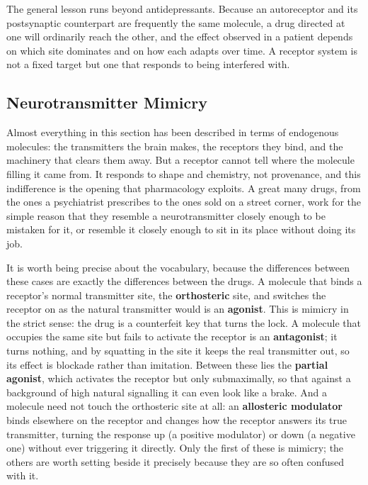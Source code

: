 \documentclass[11pt]{article}
\begin{document}
The general lesson runs beyond antidepressants. Because an autoreceptor and its postsynaptic counterpart are frequently the same molecule, a drug directed at one will ordinarily reach the other, and the effect observed in a patient depends on which site dominates and on how each adapts over time. A receptor system is not a fixed target but one that responds to being interfered with.

\subsection{Neurotransmitter Mimicry}

Almost everything in this section has been described in terms of endogenous molecules: the transmitters the brain makes, the receptors they bind, and the machinery that clears them away. But a receptor cannot tell where the molecule filling it came from. It responds to shape and chemistry, not provenance, and this indifference is the opening that pharmacology exploits. A great many drugs, from the ones a psychiatrist prescribes to the ones sold on a street corner, work for the simple reason that they resemble a neurotransmitter closely enough to be mistaken for it, or resemble it closely enough to sit in its place without doing its job.

It is worth being precise about the vocabulary, because the differences between these cases are exactly the differences between the drugs. A molecule that binds a receptor's normal transmitter site, the \textbf{orthosteric} site, and switches the receptor on as the natural transmitter would is an \textbf{agonist}. This is mimicry in the strict sense: the drug is a counterfeit key that turns the lock. A molecule that occupies the same site but fails to activate the receptor is an \textbf{antagonist}; it turns nothing, and by squatting in the site it keeps the real transmitter out, so its effect is blockade rather than imitation. Between these lies the \textbf{partial agonist}, which activates the receptor but only submaximally, so that against a background of high natural signalling it can even look like a brake. And a molecule need not touch the orthosteric site at all: an \textbf{allosteric modulator} binds elsewhere on the receptor and changes how the receptor answers its true transmitter, turning the response up (a positive modulator) or down (a negative one) without ever triggering it directly. Only the first of these is mimicry; the others are worth setting beside it precisely because they are so often confused with it.
\end{document}
